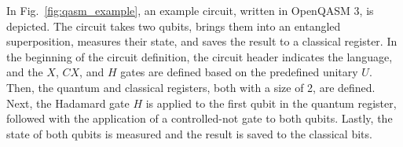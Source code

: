 In Fig.~\ref{fig:qasm_example}, an example circuit, written in OpenQASM 3, is depicted. The circuit takes two qubits, brings them into an entangled superposition, measures their state, and saves the result to a classical register. In the beginning of the circuit definition, the circuit header indicates the language, and the $X$, $CX$, and $H$ gates are defined based on the predefined unitary $U$. Then, the quantum and classical registers, both with a size of 2, are defined. Next, the Hadamard gate $H$ is applied to the first qubit in the quantum register, followed with the application of a controlled-not gate to both qubits. Lastly, the state of both qubits is measured and the result is saved to the classical bits.
